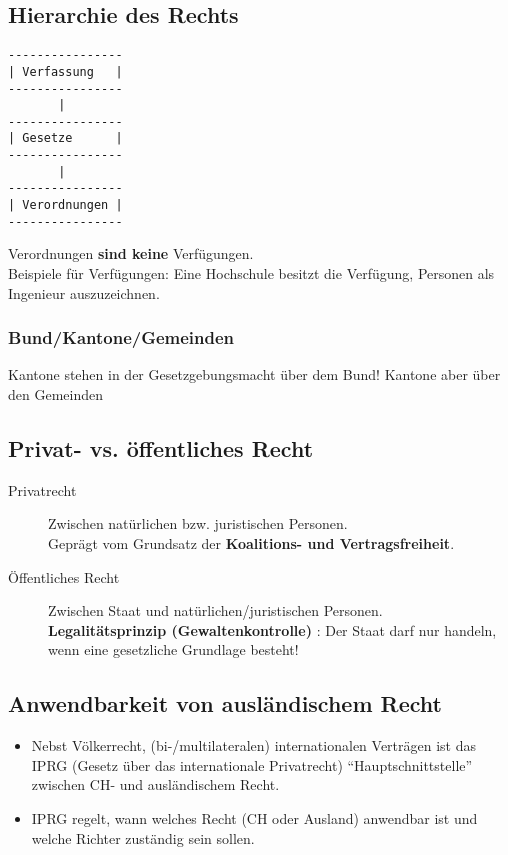 \subsection{Hierarchie des Rechts}

\begin{verbatim}
----------------
| Verfassung   |
----------------
       |
----------------
| Gesetze      |
----------------
       |
----------------
| Verordnungen |
----------------
\end{verbatim}

Verordnungen \textbf{sind keine} Verfügungen.\\
Beispiele für Verfügungen: Eine Hochschule besitzt die Verfügung,
Personen als Ingenieur auszuzeichnen.

\subsubsection{Bund/Kantone/Gemeinden}

Kantone stehen in der Gesetzgebungsmacht über dem Bund! Kantone aber
über den Gemeinden

\subsection{Privat- vs. öffentliches Recht}

\begin{description}
	\item[Privatrecht] Zwischen natürlichen bzw. juristischen Personen.\\
	Geprägt vom Grundsatz der \textbf{Koalitions- und Vertragsfreiheit}.
	\item[Öffentliches Recht] Zwischen Staat und natürlichen/juristischen
	Personen.\\
	\textbf{Legalitätsprinzip (Gewaltenkontrolle)}
	:
	Der Staat darf nur handeln,
	wenn eine gesetzliche Grundlage besteht!
\end{description}

\subsection{Anwendbarkeit von ausländischem Recht}

\begin{itemize}
	\tightlist
	\item Nebst Völkerrecht, (bi-/multilateralen) internationalen Verträgen ist
	das IPRG (Gesetz über das internationale Privatrecht)
	``Hauptschnittstelle'' zwischen CH- und ausländischem Recht.
	\item IPRG regelt, wann welches Recht (CH oder Ausland) anwendbar ist und
	welche Richter zuständig sein sollen.
\end{itemize}


